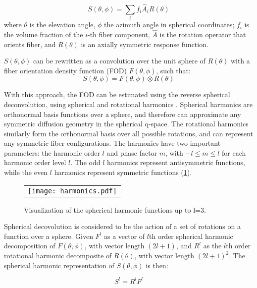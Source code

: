\begin{equation}
S(\theta, \phi) = \sum_{i}^{} f_i \hat{A}_i R(\theta)
\end{equation}
where $\theta$ is the elevation angle,  $\phi$ the azimuth angle in spherical coordinates; $f_i$ is the volume fraction of the $i$-th fiber component, $\hat{A}$ is the rotation operator that orients fiber, and $R(\theta)$ is an axially symmetric response function. 

$S(\theta,\phi) $ can be rewritten as a convolution over the unit sphere of $R(\theta)$ with a fiber orientation density function (FOD) $F(\theta, \phi)$, such that:
\begin{equation}
S(\theta, \phi) = F(\theta, \phi) \otimes R(\theta)
\end{equation}

With this approach, the FOD can be estimated using the reverse spherical deconvolution, using spherical and rotational harmonics \cite{Healy1998}. Spherical harmonics are orthonormal basis functions over a sphere, and therefore can approximate any symmetric diffusion geometry in the spherical q-space. The rotational harmonics similarly form the orthonormal basis over all possible rotations, and can represent any symmetric fiber configurations. The harmonics have two important parameters: the harmonic order $l$ and phase factor $m$, with $ -l \leq m \leq l $ for each harmonic order level $l$. The odd $l$ harmonics represent antisymmetric functions, while the even $l$ harmonics represent symmetric functions (\ref{fig:harmonics}). 

\begin{figure}[ht]
\begin{center}
\begin{tabular}{c}
\texttt{[image: harmonics.pdf]}
\end{tabular}
\caption{Visualization of the spherical harmonic functions up to l=3.}
\label{fig:harmonics}
\end{center}
\end{figure}

Spherical decovolution is considered to be the action of a set of rotations on a function over a sphere. Given $F^l $ as a vector of $l$th order spherical harmonic decomposition of  $F(\theta,\phi)$, with vector length $(2l + 1)$, and $R^l$ as the $l$th order rotational harmonic decomposite of $R(\theta)$, with vector length $(2l+1)^2$. The spherical harmonic representation of $S(\theta,\phi)$ is then:

\begin{equation}
S^l = R^l F^l
\end{equation}


